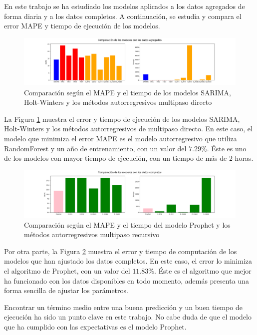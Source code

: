 \documentclass[12pt,twoside]{article}
\begin{document}
En este trabajo se ha estudiado los modelos aplicados a los datos agregados de forma diaria y a los datos completos. A continuación, se estudia y compara el error MAPE y tiempo de ejecución de los modelos.
\begin{figure}[h]
\centering
    \includegraphics[width = \textwidth]{imagenes/comp_final2.png}
    \caption{Comparación según el MAPE y el tiempo de los modelos SARIMA, Holt-Winters y los métodos autorregresivos multipaso directo}\label{fig:comp_final2}
\end{figure}

La Figura \ref{fig:comp_final2} muestra el error y tiempo de ejecución de los modelos SARIMA, Holt-Winters y los métodos autorregresivos de multipaso directo. En este caso, el modelo que minimiza el error MAPE es el modelo autorregresivo que utiliza RandomForest y un año de entrenamiento, con un valor del $7.29\%$. Éste es uno de los modelos con mayor tiempo de ejecución, con un tiempo de más de $2$ horas.
\begin{figure}[h]
\centering
    \includegraphics[width = \textwidth]{imagenes/comp_final1.png}
    \caption{Comparación según el MAPE y el tiempo del modelo Prophet y los métodos autorregresivos multipaso recursivo}\label{fig:comp_final1}
\end{figure}


Por otra parte, la Figura \ref{fig:comp_final1} muestra el error y tiempo de computación de los modelos que han ajustado los datos completos. En este caso, el error lo minimiza el algoritmo de Prophet, con un valor del $11.83\%$. Éste es el algoritmo que mejor ha funcionado con los datos disponibles en todo momento, además presenta una forma sencilla de ajustar los parámetros.

Encontrar un término medio entre una buena predicción y un buen tiempo de ejecución ha sido un punto clave en este trabajo. No cabe duda de que el modelo que ha cumplido con las expectativas es el modelo Prophet.
\end{document}
